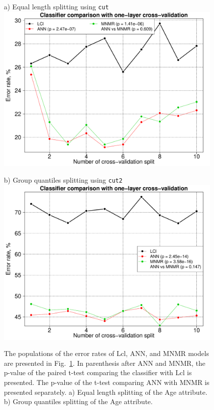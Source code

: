 \documentclass[10pt, paper=a4]{article}
\begin{document}
\begin{figure}[h!]
  \begin{minipage}{0.49\textwidth}
    a) Equal length splitting using \verb|cut|\\
    \includegraphics[width = 0.99\textwidth]{classifier_comparison_cut_1.pdf}
  \end{minipage} \hfill
  \begin{minipage}{0.49\textwidth}
    b) Group quantiles splitting using \verb|cut2|\\
    \includegraphics[width = 0.99\textwidth]{classifier_comparison_cut_2.pdf}
  \end{minipage} \vfill
  \caption{The populations of the error rates of Lcl, ANN, and MNMR
    models are presented in Fig.~\ref{fig:comparison}.  In parenthesis
    after ANN and MNMR, the p-value of the paired t-test comparing the
    classifier with Lcl is presented.  The p-value of the t-test
    comparing ANN with MNMR is presented separately. a) Equal length
    splitting of the Age attribute.  b) Group quantiles splitting of
    the Age attribute.}
  \label{fig:comparison}
\end{figure}
\end{document}

